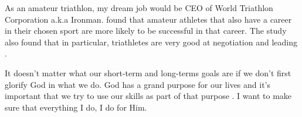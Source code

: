 \documentclass[man]{apa7}
\begin{document}
\setlength{\parindent}{10ex}
As an amateur triathlon, my dream job would be CEO of World Triathlon Corporation a.k.a Ironman. \textcite{Mac} found that amateur athletes that also have a career in their chosen sport are more likely to be successful in that career. The study also found that in particular, triathletes are very good at negotiation and leading \parencite{Mac}.

\setlength{\parindent}{10ex}
It doesn't matter what our short-term and long-terms goals are if we don't first glorify God in what we do. God has a grand purpose for our lives and it's important that we try to use our skills as part of that purpose \parencite{Merida2015}. I want to make sure that everything I do, I do for Him.



\printbibliography
\end{document}
